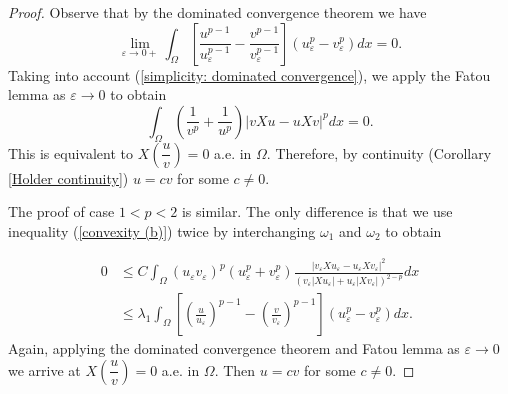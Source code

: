 \documentclass[a4paper,12pt,reqno]{amsart}
\renewcommand\eqref[1]{(\ref{#1})} %
\numberwithin{equation}{section}
\theoremstyle{plain}
\theoremstyle{definition}
\begin{document}
\begin{proof}
Observe that by the dominated convergence theorem we have
\begin{equation}\label{simplicity: dominated convergence}
\lim _{\varepsilon \rightarrow 0+} \int_{\Omega}\left[\frac{u^{p-1}}{u_{\varepsilon}^{p-1}}-\frac{v^{p-1}}{v_{\varepsilon}^{p-1}}\right]\left(u_{\varepsilon}^{p}-v_{\varepsilon}^{p}\right) d x=0    .
\end{equation}
Taking into account \eqref{simplicity: dominated convergence}, we apply the Fatou lemma as $\varepsilon\to 0$ to obtain
\begin{equation*}
\int_{\Omega}\left(\frac{1}{v^{p}}+\frac{1}{u^{p}}\right)\left|v X u-u X v\right|^{p} d x=0.    
\end{equation*}
This is equivalent to  $X\left(\dfrac{u}{v}\right)=0$ a.e. in $\Omega$.  Therefore, by continuity (Corollary \ref{Holder continuity}) $u=cv$ for some $c\neq 0$. 

The proof of case $1<p<2$ is similar. The only difference is that we use inequality \eqref{convexity (b)} twice by interchanging $\omega_{1}$ and $\omega_{2}$ to obtain

\begin{equation*}
\begin{aligned}
0 & \leq C \int_{\Omega}\left(u_{\varepsilon} v_{\varepsilon}\right)^{p}\left(u_{\varepsilon}^{p}+v_{\varepsilon}^{p}\right) \frac{\left|v_{\varepsilon} X u_{\varepsilon}-u_{\varepsilon} X v_{\varepsilon}\right|^{2}}{\left(v_{\varepsilon}\left|X u_{\varepsilon}\right|+u_{\varepsilon}\left|X v_{\varepsilon}\right|\right)^{2-p}} d x \\
& \leq\lambda_{1} \int_{\Omega}\left[\left(\frac{u}{u_{\varepsilon}}\right)^{p-1}-\left(\frac{v}{v_{\varepsilon}}\right)^{p-1}\right]\left(u_{\varepsilon}^{p}-v_{\varepsilon}^{p}\right) d x.
\end{aligned}    
\end{equation*}
Again, applying the dominated convergence theorem and Fatou lemma as $\varepsilon\to 0$ we arrive at $X\left(\dfrac{u}{v}\right)=0$ a.e. in $\Omega$. Then $u=cv$ for some $c\neq 0$.
\end{proof}
\end{document}
